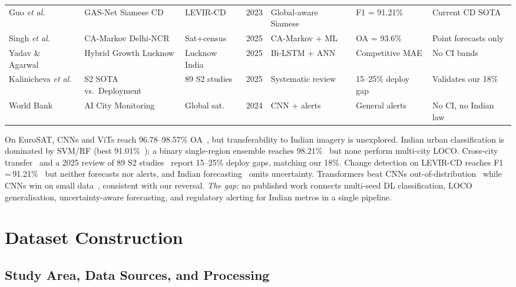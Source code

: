 \documentclass[conference]{IEEEtran}
\begin{document}
\begin{table}[t]
\begin{tabular}{p{2.1cm} p{3.5cm} p{1.9cm} c p{2.9cm} p{2.0cm} p{1.8cm}}
Guo \emph{et al.}~\cite{gasnet2023} & GAS-Net Siamese CD & LEVIR-CD & 2023 & Global-aware Siamese & F1 = 91.21\% & Current CD SOTA\\
Singh \emph{et al.}~\cite{camarkov2025} & CA-Markov Delhi-NCR & Sat+census & 2025 & CA-Markov + ML & OA = 93.6\% & Point forecasts only\\
Yadav \& Agarwal~\cite{lucknow2025} & Hybrid Growth Lucknow & Lucknow India & 2025 & Bi-LSTM + ANN & Competitive MAE & No CI bands\\
Kalinicheva \emph{et al.}~\cite{mdpi2025} & S2 SOTA vs.\ Deployment & 89 S2 studies & 2025 & Systematic review & 15--25\% deploy gap & Validates our 18\%\\
World Bank~\cite{worldbank2024} & AI City Monitoring & Global sat.\ & 2024 & CNN + alerts & General alerts & No CI, no Indian law\\
\bottomrule
\end{tabular}
\end{table}

On EuroSAT, CNNs and ViTs reach 96.78--98.57\% OA~\cite{he2016,tan2019,helber2019,dosovitskiy2021}, but transferability to Indian imagery is unexplored. Indian urban classification is dominated by SVM/RF (best 91.01\%~\cite{chamoli2024}); a binary single-region ensemble reaches 98.21\%~\cite{katpadi2025} but none perform multi-city LOCO. Cross-city transfer~\cite{li2023,wang2023} and a 2025 review of 89 S2 studies~\cite{mdpi2025} report 15--25\% deploy gaps, matching our 18\%. Change detection on LEVIR-CD reaches F1\,=\,91.21\%~\cite{gasnet2023} but neither forecasts nor alerts, and Indian forecasting~\cite{camarkov2025,lucknow2025,caann2025} omits uncertainty. Transformers beat CNNs out-of-distribution~\cite{bai2021} while CNNs win on small data~\cite{springerbigdata2023,appliedintel2024}, consistent with our reversal. \emph{The gap:} no published work connects multi-seed DL classification, LOCO generalisation, uncertainty-aware forecasting, and regulatory alerting for Indian metros in a single pipeline.

\section{Dataset Construction}

\subsection{Study Area, Data Sources, and Processing}
\end{document}
